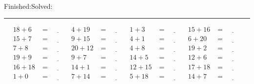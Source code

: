 \documentclass{article}
\begin{document}
\begin{sloppy}
\begin{center}
{\selectfont {Started:}\underline{\hspace{1.5cm}}{Finished:}\underline{\hspace{1.5cm}}{Solved:}\underline{\hspace{1.5cm}}}
\end{center}
\hrule
\begin{align*}
    {18} + {6} &= \underline{\hspace{1cm}} & {4} + {19} &= \underline{\hspace{1cm}} & {1} + {3} &= \underline{\hspace{1cm}} & {15} + {16} &= \underline{\hspace{1cm}} \\
    {15} + {7} &= \underline{\hspace{1cm}} & {9} + {15} &= \underline{\hspace{1cm}} & {4} + {1} &= \underline{\hspace{1cm}} & {6} + {20} &= \underline{\hspace{1cm}} \\
    {7} + {8} &= \underline{\hspace{1cm}} & {20} + {12} &= \underline{\hspace{1cm}} & {4} + {8} &= \underline{\hspace{1cm}} & {19} + {2} &= \underline{\hspace{1cm}} \\
    {19} + {9} &= \underline{\hspace{1cm}} & {9} + {7} &= \underline{\hspace{1cm}} & {14} + {5} &= \underline{\hspace{1cm}} & {12} + {6} &= \underline{\hspace{1cm}} \\
    {16} + {18} &= \underline{\hspace{1cm}} & {14} + {1} &= \underline{\hspace{1cm}} & {12} + {15} &= \underline{\hspace{1cm}} & {17} + {18} &= \underline{\hspace{1cm}} \\
    {1} + {0} &= \underline{\hspace{1cm}} & {7} + {14} &= \underline{\hspace{1cm}} & {5} + {18} &= \underline{\hspace{1cm}} & {14} + {7} &= \underline{\hspace{1cm}} \\

\end{align*}
\end{sloppy}
\end{document}
